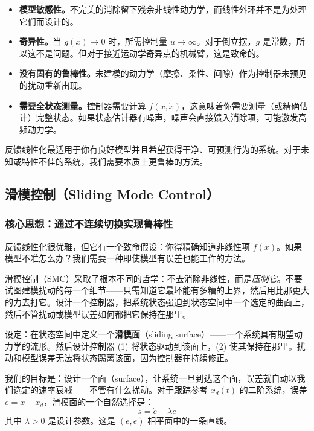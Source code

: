 \begin{itemize}[nosep]
    \item \textbf{模型敏感性。}不完美的消除留下残余非线性动力学，而线性外环并不是为处理它们而设计的。
    \item \textbf{奇异性。}当 $g(x) \to 0$ 时，所需控制量 $u \to \infty$。对于倒立摆，$g$ 是常数，所以这不是问题。但对于接近运动学奇异点的机械臂，这是致命的。
    \item \textbf{没有固有的鲁棒性。}未建模的动力学（摩擦、柔性、间隙）作为控制器未预见的扰动重新出现。
    \item \textbf{需要全状态测量。}控制器需要计算 $f(x, \dot{x})$，这意味着你需要测量（或精确估计）完整状态。如果状态估计器有噪声，噪声会直接馈入消除项，可能激发高频动力学。
\end{itemize}

反馈线性化最适用于你有良好模型并且希望获得干净、可预测行为的系统。对于未知或特性不佳的系统，我们需要本质上更鲁棒的方法。

\subsection{滑模控制（Sliding Mode Control）}

\subsubsection{核心思想：通过不连续切换实现鲁棒性}

反馈线性化很优雅，但它有一个致命假设：你得精确知道非线性项 $f(x)$。如果模型不准怎么办？我们需要一种即使模型有误差也能工作的方法。

滑模控制（SMC）采取了根本不同的哲学：不去消除非线性，而是\textit{压制它}。不要试图建模扰动的每一个细节——只需知道它最坏能有多糟的上界，然后用比那更大的力去打它。设计一个控制器，把系统状态强迫到状态空间中一个选定的曲面上，然后不管扰动或模型误差如何都把它保持在那里。

设定：在状态空间中定义一个\textbf{滑模面}（sliding surface）——一个系统具有期望动力学的流形。然后设计控制器 (1) 将状态驱动到该面上，(2) 使其保持在那里。扰动和模型误差无法将状态踢离该面，因为控制器在持续修正。

我们的目标是：设计一个面（surface），让系统一旦到达这个面，误差就自动以我们选定的速率衰减——不管有什么扰动。对于跟踪参考 $x_d(t)$ 的二阶系统，误差 $e = x - x_d$，滑模面的一个自然选择是：
\begin{equation}
s = \dot{e} + \lambda e
\end{equation}
其中 $\lambda > 0$ 是设计参数。这是 $(e, \dot{e})$ 相平面中的一条直线。


